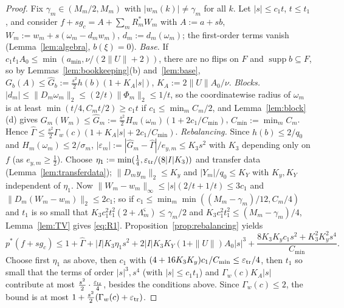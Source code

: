 \documentclass[10pt]{amsart}
\theoremstyle{definition}
\theoremstyle{remark}
\newcommand{\supp}{\operatorname{supp}}
\begin{document}
\begin{proof}
Fix $\gamma_m\in(M_m/2,M_m)$ with $|w_m(k)|\ne\gamma_m$ for all $k$.  Let
$|s|\le c_1t$, $t\le t_1$, and consider $f+sg_c=A+\sum_mR^*_mW_m$ with
$A:=a+sb$, $W_m:=w_m+s(\omega_m-d_mw_m)$, $d_m:=d_m(\omega_m)$; the
first-order terms vanish (Lemma~\ref{lem:algebra}, $b(\xi)=0$).
\emph{Base.}  If $c_1t_1A_0\le\min(a_{\min},\nu/(2\|U\|+2))$, there are no
flips on $F$ and $\supp b\subseteq F$, so by
Lemmas~\ref{lem:bookkeeping}(b) and~\ref{lem:base},
$G_b(A)\le\hat G_b:=\frac{s^2}2h(b)(1+K_A|s|)$, $K_A:=2\|U\|A_0/\nu$.
\emph{Blocks.}  $|d_m|\le\|D_m\omega_m\|_2\le(2/t)\|\Phi_m\|_2\le1/t$, so the
coordinatewise radius of $\omega_m$ is at least $\min(t/4,C_mt/2)\ge c_1t$
if $c_1\le\min_mC_m/2$, and Lemma~\ref{lem:block}(d) gives $G_m(W_m)\le\hat
G_m:=\frac{s^2}2H_m(\omega_m)(1+2c_1/C_{\min})$, $C_{\min}:=\min_mC_m$.
Hence $\hat\Gamma\le\frac{s^2}2\Gamma_w(c)(1+K_A|s|+2c_1/C_{\min})$.
\emph{Rebalancing.}  Since $h(b)\le2/q_0$ and $H_m(\omega_m)\le2/\sigma_m$,
$|\varepsilon_m|:=|\hat G_m-\hat\Gamma|/e_{y,m}\le K_3s^2$ with $K_3$
depending only on $f$ (as $e_{y,m}\ge\frac12$).  Choose
$\eta_1:=\min(\frac14,\varepsilon_{\rm tr}/(8|I|K_3))$ and transfer data
(Lemma~\ref{lem:transferdata}); $\|D_my_m\|_2\le K_y$ and $|Y_m|/q_0\le K_Y$
with $K_y,K_Y$ independent of $\eta_1$.  Now $\|W_m-w_m\|_\infty\le
|s|(2/t+1/t)\le3c_1$ and $\|D_m(W_m-w_m)\|_2\le2c_1$; so if $c_1\le
\min_m\min((M_m-\gamma_m)/12,C_m/4)$ and $t_1$ is so small that $K_3c_1^2t_1^2
(2+\Lambda^\varsigma_m)\le\gamma_m/2$ and $K_3c_1^2t_1^2\le(M_m-\gamma_m)/4$,
Lemma~\ref{lem:TV} gives \eqref{eq:R1}.  Proposition~\ref{prop:rebalancing}
yields
\[
 p^*(f+sg_c)\le1+\hat\Gamma+|I|K_3\eta_1s^2+2|I|K_3K_Y(1+\|U\|)A_0|s|^3+
 \frac{8K_3K_yc_1s^2+K_3^2K_y^2s^4}{C_{\min}} .
\]
Choose first $\eta_1$ as above, then $c_1$ with
$(4+16K_3K_y)c_1/C_{\min}\le\varepsilon_{\rm tr}/4$, then $t_1$ so small that
the terms of order $|s|^3,s^4$ (with $|s|\le c_1t_1$) and $\Gamma_w(c)K_A|s|$
contribute at most $\frac{s^2}2\cdot\frac{\varepsilon_{\rm tr}}4$, besides the
conditions above.  Since $\Gamma_w(c)\le2$, the bound is at most
$1+\frac{s^2}2(\Gamma_w(c)+\varepsilon_{\rm tr})$.
\end{proof}
\end{document}
